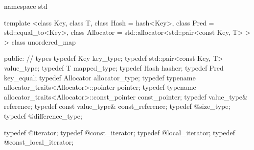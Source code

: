 \begin{codeblock}
namespace std {
  template <class Key,
            class T,
            class Hash  = hash<Key>,
            class Pred  = std::equal_to<Key>,
            class Allocator = std::allocator<std::pair<const Key, T> > >
  class unordered_map
  {
  public:
    // types
    typedef Key                                                 key_type;
    typedef std::pair<const Key, T>                             value_type;
    typedef T                                                   mapped_type;
    typedef Hash                                                hasher;
    typedef Pred                                                key_equal;
    typedef Allocator                                           allocator_type;
    typedef typename allocator_traits<Allocator>::pointer       pointer;
    typedef typename allocator_traits<Allocator>::const_pointer const_pointer;
    typedef value_type&                                         reference;
    typedef const value_type&                                   const_reference;
    typedef @\impdef@                              size_type;
    typedef @\impdef@                              difference_type;

    typedef @\impdef@                              iterator;
    typedef @\impdef@                              const_iterator;
    typedef @\impdef@                              local_iterator;
    typedef @\impdef@                              const_local_iterator;

}}
\end{codeblock}

